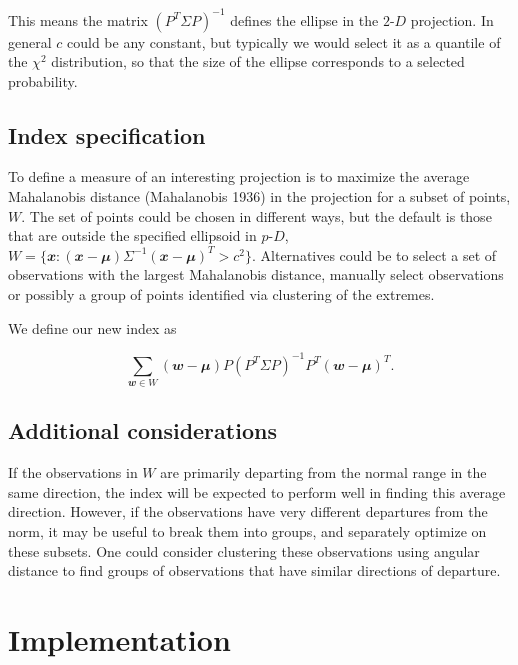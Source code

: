 \documentclass[
  12pt,
]{interact}
\newcommand\pD{$p\text{-}D$}
\newcommand\gD{$2\text{-}D$}
\begin{document}
This means the matrix \((P^T \Sigma P)^{-1}\) defines the ellipse in the
\gD{} projection. In general \(c\) could be any constant, but typically
we would select it as a quantile of the \(\chi^2\) distribution, so that
the size of the ellipse corresponds to a selected probability.

\subsection{Index specification}\label{index-specification}

To define a measure of an interesting projection is to maximize the
average Mahalanobis distance (Mahalanobis 1936) in the projection for a
subset of points, \(W\). The set of points could be chosen in different
ways, but the default is those that are outside the specified ellipsoid
in \pD{},
\(W = \{\mathbfit{x}: (\mathbfit{x}-\mathbfit{\mu}) \Sigma^{-1}(\mathbfit{x}-\mathbfit{\mu})^T > c^2\}\).
Alternatives could be to select a set of observations with the largest
Mahalanobis distance, manually select observations or possibly a group
of points identified via clustering of the extremes.

We define our new index as

\begin{equation}
\sum_{\mathbfit{w} \in W} (\mathbfit{w} - \mathbfit{\mu}) P (P^T\Sigma P)^{-1}P^T(\mathbfit{w} - \mathbfit{\mu})^T.
\end{equation}

\subsection{Additional considerations}\label{additional-considerations}

If the observations in \(W\) are primarily departing from the normal
range in the same direction, the index will be expected to perform well
in finding this average direction. However, if the observations have
very different departures from the norm, it may be useful to break them
into groups, and separately optimize on these subsets. One could
consider clustering these observations using angular distance to find
groups of observations that have similar directions of departure.

\section{Implementation}\label{sec-implementation}
\end{document}
